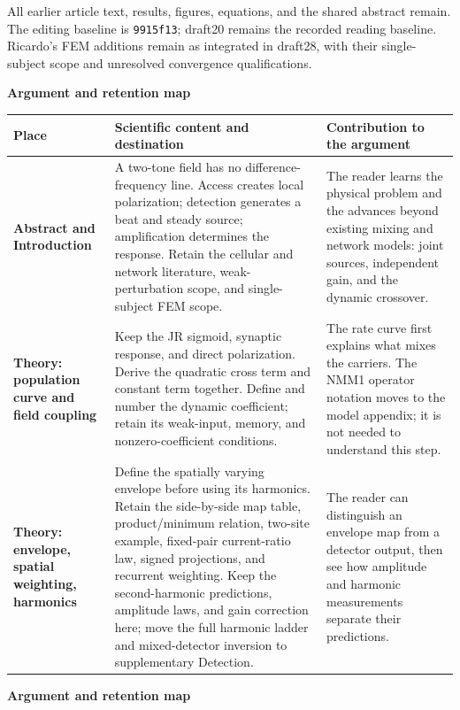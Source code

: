 \documentclass[11pt,a4paper,landscape]{article}
\newcommand{\pagetitle}[2]{%
  {\Large\sffamily\bfseries\color{ink}#1\par}
  \vspace{2pt}{\normalsize #2\par}\vspace{5pt}}
\begin{document}
All earlier article text, results, figures, equations, and the shared abstract
remain. The editing baseline is \texttt{9915f13}; draft20 remains the recorded
reading baseline. Ricardo's FEM additions remain as integrated in draft28,
with their single-subject scope and unresolved convergence qualifications.
\newpage
\pagetitle{Argument and retention map}{Section order in the revised article and supplement}
\begin{tabularx}{\textwidth}{@{}L{43mm}YY@{}}
\toprule
\textbf{Place} & \textbf{Scientific content and destination} & \textbf{Contribution to the argument}\\
\midrule
\textbf{Abstract and Introduction} & A two-tone field has no difference-frequency line. Access creates local polarization; detection generates a beat and steady source; amplification determines the response. Retain the cellular and network literature, weak-perturbation scope, and single-subject FEM scope. & The reader learns the physical problem and the advances beyond existing mixing and network models: joint sources, independent gain, and the dynamic crossover.\\[8pt]
\textbf{Theory: population curve and field coupling} & Keep the JR sigmoid, synaptic response, and direct polarization. Derive the quadratic cross term and constant term together. Define and number the dynamic coefficient; retain its weak-input, memory, and nonzero-coefficient conditions. & The rate curve first explains what mixes the carriers. The NMM1 operator notation moves to the model appendix; it is not needed to understand this step.\\[8pt]
\textbf{Theory: envelope, spatial weighting, harmonics} & Define the spatially varying envelope before using its harmonics. Retain the side-by-side map table, product/minimum relation, two-site example, fixed-pair current-ratio law, signed projections, and recurrent weighting. Keep the second-harmonic predictions, amplitude laws, and gain correction here; move the full harmonic ladder and mixed-detector inversion to supplementary Detection. & The reader can distinguish an envelope map from a detector output, then see how amplitude and harmonic measurements separate their predictions.\\[8pt]
\bottomrule\end{tabularx}
\newpage
\pagetitle{Argument and retention map}{Section order in the revised article and supplement}
\end{document}
